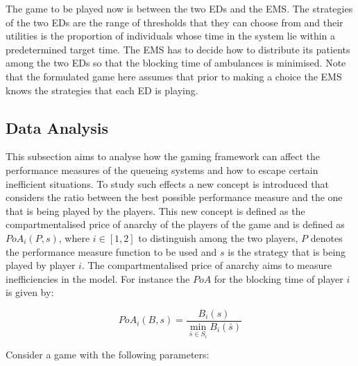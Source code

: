 The game to be played now is between the two EDs and the EMS. 
The strategies of the two EDs are the range of thresholds that they can choose
from and their utilities is the proportion of individuals whose time in the 
system lie within a predetermined target time.
The EMS has to decide how to distribute its patients among the two EDs so that 
the blocking time of ambulances is minimised. 
Note that the formulated game here assumes that prior to making a choice the 
EMS knows the strategies that each ED is playing. 


\subsection{Data Analysis}

This subsection aims to analyse how the gaming framework can affect the 
performance measures of the queueing systems and how to escape certain 
inefficient situations.
To study such effects a new concept is introduced that considers the ratio 
between the best possible performance measure and the one that is being
played by the players.
This new concept is defined as the compartmentalised price of anarchy of the 
players of the game and is defined as \(PoA_i(P, s)\), where \(i \in [1, 2]\) 
to distinguish among the two players, \(P\) denotes the performance measure 
function to be used and \(s\) is the strategy that is being played by player 
\( i \). 
The compartmentalised price of anarchy aims to measure inefficiencies in the 
model.
For instance the \(PoA\) for the blocking time of player \(i\) is given by:

\begin{equation}\label{eq:poa_compartmentalised}
    PoA_{i}(B, s) = \frac{B_i(s)}{\min_{\bar{s} \in S_i} B_i(\bar{s})}
\end{equation}

\newpage
Consider a game with the following parameters:

